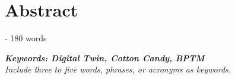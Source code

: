\chapter*{Abstract}
 - 180 words 


\textit{\textbf{Keywords: Digital Twin, Cotton Candy, BPTM} \\Include three to five words, phrases, or acronyms as keywords.}
